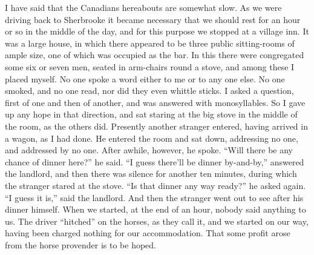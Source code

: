 I have said that the Canadians hereabouts are somewhat slow.  As we
were driving back to Sherbrooke it became necessary that we should
rest for an hour or so in the middle of the day, and for this
purpose we stopped at a village inn.  It was a large house, in
which there appeared to be three public sitting-rooms of ample
size, one of which was occupied as the bar.  In this there were
congregated some six or seven men, seated in arm-chairs round a
stove, and among these I placed myself.  No one spoke a word either
to me or to any one else.  No one smoked, and no one read, nor did
they even whittle sticks.  I asked a question, first of one and
then of another, and was answered with monosyllables.  So I gave up
any hope in that direction, and sat staring at the big stove in the
middle of the room, as the others did.  Presently another stranger
entered, having arrived in a wagon, as I had done.  He entered the
room and sat down, addressing no one, and addressed by no one.
After awhile, however, he spoke.  ``Will there be any chance of
dinner here?'' he said.  ``I guess there'll be dinner by-and-by,''
answered the landlord, and then there was silence for another ten
minutes, during which the stranger stared at the stove.  ``Is that
dinner any way ready?'' he asked again.  ``I guess it is,'' said the
landlord.  And then the stranger went out to see after his dinner
himself.  When we started, at the end of an hour, nobody said
anything to us.  The driver ``hitched'' on the horses, as they call
it, and we started on our way, having been charged nothing for our
accommodation.  That some profit arose from the horse provender is
to be hoped.


